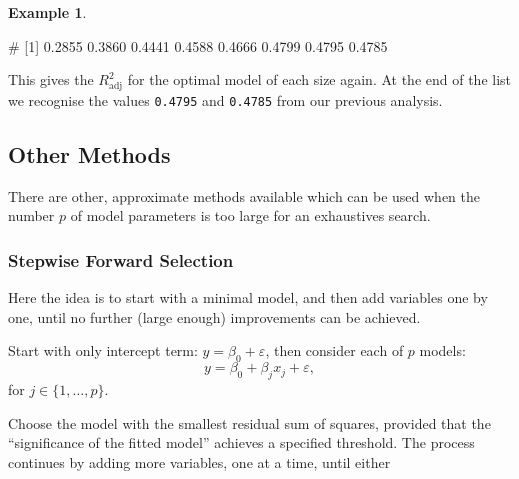 \documentclass[
  a4paper,
]{article}
\newenvironment{Shaded}{\begin{snugshade}}{\end{snugshade}}
\newcommand{\DecValTok}[1]{\textcolor[rgb]{0.00,0.00,0.81}{#1}}
\newcommand{\FunctionTok}[1]{\textcolor[rgb]{0.00,0.00,0.00}{#1}}
\newcommand{\NormalTok}[1]{#1}
\newcommand{\SpecialCharTok}[1]{\textcolor[rgb]{0.00,0.00,0.00}{#1}}
\theoremstyle{definition}
\theoremstyle{definition}
\newtheorem{example}{Example}[section]
\theoremstyle{definition}
\theoremstyle{definition}
\theoremstyle{remark}
\begin{document}
\begin{example}
\begin{Shaded}
\end{Shaded}

\begin{Shaded}
\begin{Highlighting}[]
\NormalTok{\# [1] 0.2855 0.3860 0.4441 0.4588 0.4666 0.4799 0.4795 0.4785}
\end{Highlighting}
\end{Shaded}

This gives the \(R^2_\mathrm{adj}\) for the optimal model of each size
again. At the end of the list we recognise the values \texttt{0.4795} and
\texttt{0.4785} from our previous analysis.
\end{example}

\hypertarget{other-methods}{%
\subsection{Other Methods}\label{other-methods}}

There are other, approximate methods available which can be used
when the number \(p\) of model parameters is too large for an exhaustives
search.

\hypertarget{stepwise-forward-selection}{%
\subsubsection{Stepwise Forward Selection}\label{stepwise-forward-selection}}

Here the idea is to start with a minimal model, and then add variables one by
one, until no further (large enough) improvements can be achieved.

Start with only intercept term: \(y=\beta_0 + \varepsilon\), then
consider each of \(p\) models:
\begin{equation*}
  y
  = \beta_0 + \beta_j x_j + \varepsilon,
\end{equation*}
for \(j \in \{1, \ldots, p\}\).

Choose the model with the smallest residual sum of squares, provided that the
``significance of the fitted model'' achieves a specified threshold. The process
continues by adding more variables, one at a time, until either
\end{document}
